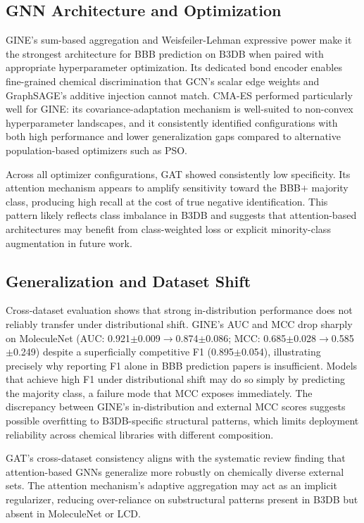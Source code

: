 \documentclass[conference]{IEEEtran}
\begin{document}
\subsection{GNN Architecture and Optimization}

GINE's sum-based aggregation and Weisfeiler-Lehman expressive power make it the strongest architecture for BBB prediction on B3DB when paired with appropriate hyperparameter optimization. Its dedicated bond encoder enables fine-grained chemical discrimination that GCN's scalar edge weights and GraphSAGE's additive injection cannot match. CMA-ES performed particularly well for GINE: its covariance-adaptation mechanism is well-suited to non-convex hyperparameter landscapes, and it consistently identified configurations with both high performance and lower generalization gaps compared to alternative population-based optimizers such as PSO.

Across all optimizer configurations, GAT showed consistently low specificity. Its attention mechanism appears to amplify sensitivity toward the BBB$+$ majority class, producing high recall at the cost of true negative identification. This pattern likely reflects class imbalance in B3DB and suggests that attention-based architectures may benefit from class-weighted loss or explicit minority-class augmentation in future work.

\subsection{Generalization and Dataset Shift}

Cross-dataset evaluation shows that strong in-distribution performance does not reliably transfer under distributional shift. GINE's AUC and MCC drop sharply on MoleculeNet (AUC: 0.921$\pm$0.009$\to$0.874$\pm$0.086; MCC: 0.685$\pm$0.028$\to$0.585$\pm$0.249) despite a superficially competitive F1 (0.895$\pm$0.054), illustrating precisely why reporting F1 alone in BBB prediction papers is insufficient. Models that achieve high F1 under distributional shift may do so simply by predicting the majority class, a failure mode that MCC exposes immediately. The discrepancy between GINE's in-distribution and external MCC scores suggests possible overfitting to B3DB-specific structural patterns, which limits deployment reliability across chemical libraries with different composition.

GAT's cross-dataset consistency aligns with the systematic review finding that attention-based GNNs generalize more robustly on chemically diverse external sets. The attention mechanism's adaptive aggregation may act as an implicit regularizer, reducing over-reliance on substructural patterns present in B3DB but absent in MoleculeNet or LCD.
\end{document}
